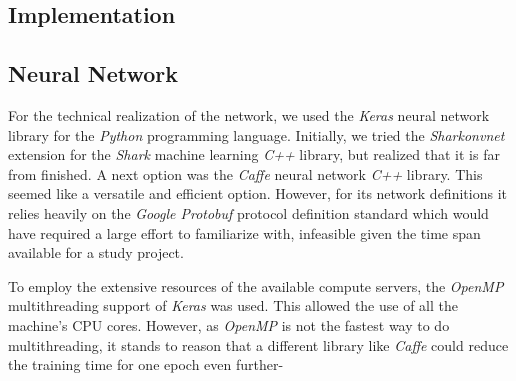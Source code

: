 \documentclass[11pt, a4paper]{article}
\begin{document}
\begin{appendix}
	\section{Implementation}
	
	\subsection{Neural Network}
	For the technical realization of the network, we used the \emph{Keras} neural network library for the \emph{Python} programming language. Initially, we tried the \emph{Sharkonvnet} extension for the \emph{Shark} machine learning \emph{C++} library, but realized that it is far from finished. A next option was the \emph{Caffe} neural network \emph{C++} library. This seemed like a versatile and efficient option. However, for its network definitions it relies heavily on the \emph{Google Protobuf} protocol definition standard which would have required a large effort to familiarize with, infeasible given the time span available for a study project.
	
	To employ the extensive resources of the available compute servers, the \emph{OpenMP} multithreading support of \emph{Keras} was used. This allowed the use of all the machine's CPU cores. However, as \emph{OpenMP} is not the fastest way to do multithreading, it stands to reason that a different library like \emph{Caffe} could reduce the training time for one epoch even further-
	

\end{appendix}
\end{document}
